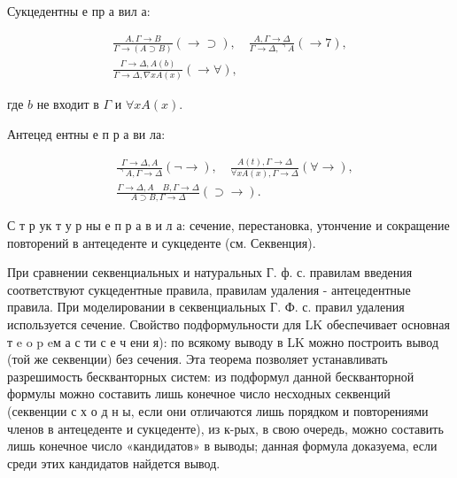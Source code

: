 \documentclass[10pt]{article}
\begin{document}
Сукцедентны е пр а вил а:



\[

\begin{gathered}

\frac{A, \Gamma \rightarrow B}{\Gamma \rightarrow(A \supset B)}(\longrightarrow \supset), \quad \frac{A, \Gamma \rightarrow \Delta}{\Gamma \rightarrow \Delta,\urcorner A}(\longrightarrow 7), \\

\frac{\Gamma \rightarrow \Delta, A(b)}{\Gamma \rightarrow \Delta, \nabla x A(x)}(\longrightarrow \forall),

\end{gathered}

\]



где $b$ не входит в $\Gamma$ и $\forall x A(x)$.



Антецед ентны е п р а ви ла:



\[

\begin{aligned}

& \frac{\Gamma \rightarrow \Delta, A}{\urcorner A, \Gamma \rightarrow \Delta}(\neg \longrightarrow), \quad \frac{A(t), \Gamma \rightarrow \Delta}{\forall x A(x), \Gamma \rightarrow \Delta}(\forall \longrightarrow), \\

& \frac{\Gamma \rightarrow \Delta, A \quad B, \Gamma \rightarrow \Delta}{A \supset B, \Gamma \rightarrow \Delta}(\supset \longrightarrow) .

\end{aligned}

\]



С т р ук т у р ны е п р а в и л а: сечение, перестановка, утончение и сокращение повторений в антецеденте и сукцеденте (см. Секвенция).



При сравнении секвенциальных и натуральных Г. ф. с. правилам введения соответствуют сукцедентные правила, правилам удаления - антецедентные правила. При моделировании в секвенциальных Г. Ф. с. правил удаления используется сечение. Свойство подформульности для LK обеспечивает основная т e o p eм а с ти с е ч ени я): по всякому выводу в LK можно построить вывод (той же секвенции) без сечения. Эта теорема позволяет устанавливать разрешимость бескванторных систем: из подформул данной бескванторной формулы можно составить лишь конечное число несходных секвенций (секвенции с х о д н ы, если они отличаются лишь порядком и повторениями членов в антецеденте и сукцеденте), из к-рых, в свою очередь, можно составить лишь конечное число «кандидатов» в выводы; данная формула доказуема, если среди этих кандидатов найдется вывод.
\end{document}
